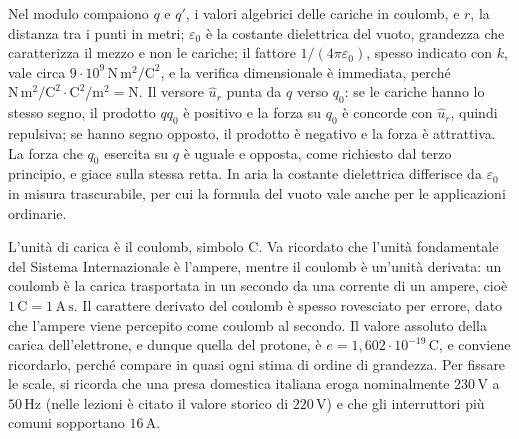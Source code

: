 \documentclass[11pt,a4paper]{article}
\newcommand{\epz}{\varepsilon_0}
\newcommand{\uv}{\hat{u}}
\newcommand{\titoletto}[1]{\par\Needspace{4\baselineskip}\medskip\noindent{\large\scshape #1}\par\nopagebreak\smallskip\noindent}
\begin{document}
Nel modulo compaiono $q$ e $q'$, i valori algebrici delle cariche in coulomb, e $r$, la distanza tra i punti in metri; $\epz$ è la costante dielettrica del vuoto, grandezza che caratterizza il mezzo e non le cariche; il fattore $1/(4\pi\epz)$, spesso indicato con $k$, vale circa $9\cdot 10^{9}\,\mathrm{N\,m^2/C^2}$, e la verifica dimensionale è immediata, perché $\mathrm{N\,m^2/C^2}\cdot\mathrm{C^2/m^2}=\mathrm{N}$. Il versore $\uv_r$ punta da $q$ verso $q_0$: se le cariche hanno lo stesso segno, il prodotto $qq_0$ è positivo e la forza su $q_0$ è concorde con $\uv_r$, quindi repulsiva; se hanno segno opposto, il prodotto è negativo e la forza è attrattiva. La forza che $q_0$ esercita su $q$ è uguale e opposta, come richiesto dal terzo principio, e giace sulla stessa retta. In aria la costante dielettrica differisce da $\epz$ in misura trascurabile, per cui la formula del vuoto vale anche per le applicazioni ordinarie.

\titoletto{Unità di misura della carica}
L'unità di carica è il coulomb, simbolo $\mathrm{C}$. Va ricordato che l'unità fondamentale del Sistema Internazionale è l'ampere, mentre il coulomb è un'unità derivata: un coulomb è la carica trasportata in un secondo da una corrente di un ampere, cioè $1\,\mathrm{C}=1\,\mathrm{A\,s}$. Il carattere derivato del coulomb è spesso rovesciato per errore, dato che l'ampere viene percepito come coulomb al secondo. Il valore assoluto della carica dell'elettrone, e dunque quella del protone, è $e=1,602\cdot 10^{-19}\,\mathrm{C}$, e conviene ricordarlo, perché compare in quasi ogni stima di ordine di grandezza. Per fissare le scale, si ricorda che una presa domestica italiana eroga nominalmente $230\,\mathrm{V}$ a $50\,\mathrm{Hz}$ (nelle lezioni è citato il valore storico di $220\,\mathrm{V}$) e che gli interruttori più comuni sopportano $16\,\mathrm{A}$.
\end{document}

